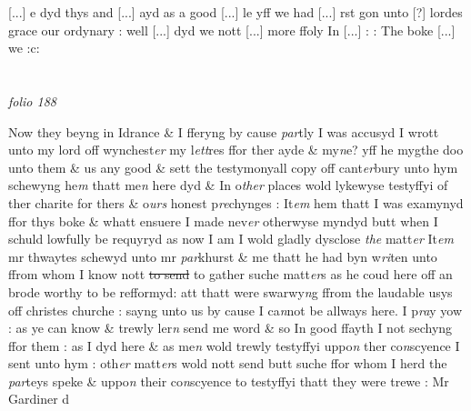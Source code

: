 \documentclass[12pt, a4paper]{book}
\begin{document}
				[...]
			e dyd thys and  
				[...]
			ayd as a good 
				[...]
			le yff we had   
				[...]
			rst gon unto [?] lordes grace our  ordynary : well 
				[...]
			 dyd we nott 
				[...]
			 more ffoly In  
				[...]
			 : : The boke  
				[...]
			we :c:   
            		
            		
\dotfill
					  \section*{}

\textit{folio 188}
      				
      				
      				
      				Now they beyng in Idrance \& I fferyng by cause \textit{par}tly I was
			 accusyd I wrott unto my lord off wynchest\textit{er} my l\textit{ett}res ffor ther ayde \& my\textit{n}e?
			 yff he mygthe doo unto them \& us
			 any good \& sett the testymonyall copy off cant\textit{er}bury unto hym schewyng he\textit{m} thatt me\textit{n} here dyd \& In o\textit{ther} places wold lykewyse testyffyi of ther charite
			 for thers \& o\textit{urs} honest p\textit{re}chynges : It\textit{em} hem thatt I was examynyd ffor thys boke \& whatt ensuere I made nev\textit{er} otherwyse myndyd butt when I schuld lowfully be requyryd as now I am I wold gladly dysclose \textit{the} matt\textit{er}
      				\textit{ }It\textit{em }mr thwaytes schewyd unto mr \textit{par}khurst \& me thatt he had byn w\textit{ri}ten unto ffrom whom I know nott \sout{to send }to gather suche matt\textit{er}s as he coud here off an brode worthy to be refformyd: att thatt were swarwy\textit{n}g ffrom the laudable usys off christes churche : sayng unto us by cause I ca\textit{n}not be allways here. I p\textit{ra}y yow : as ye can know \& trewly ler\textit{n} send me word \& so In good ffayth I not sechyng ffor them : as I dyd here \& as me\textit{n} wold trewly testyffyi uppo\textit{n} ther co\textit{n}scyence I sent unto hym : oth\textit{er} matt\textit{er}s wold nott send butt suche ffor whom I herd the \textit{par}teys speke \& uppo\textit{n} their co\textit{n}scyence to testyffyi thatt they were trewe : \textit{ }Mr Gardiner d
      				
\end{document}
